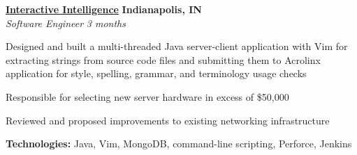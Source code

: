 %
    \headerrow
        {\textbf{\href{https://www.genesys.com/inin}{Interactive Intelligence}}}
        {\textbf{Indianapolis, IN}}
    \\
    \headerrow
        {\emph{Software Engineer}}
        {\emph{3 months}}
    \begin{itemize*}
         \item Designed and built a multi-threaded Java server-client application with Vim for extracting strings from
                source code files and submitting them to Acrolinx application for style, spelling, grammar, and terminology
                usage checks
        \item Responsible for selecting new server hardware in excess of \$50,000
        \item Reviewed and proposed improvements to existing networking infrastructure
    \end{itemize*}

    \hspace{1.0em}
    \textbf{Technologies:} Java, Vim, MongoDB, command-line scripting, Perforce, Jenkins


